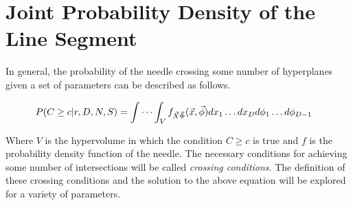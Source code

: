 \documentclass{article}
\begin{document}
\section{Joint Probability Density of the Line Segment} \label{s:needle pdf}
In general, the probability of the needle crossing some number of hyperplanes given
a set of parameters can be described as follows.

\begin{align} 
	P(C\ge c|r, D, N, S)&=\idotsint_V f_{\vec{X}\vec\Phi}(\vec{x}, \vec{\phi})dx_1 \hdots dx_D d\phi_1 \hdots d\phi_{D-1} \label{eq:raw integral}
\end{align}

Where $V$ is the hypervolume in which the condition $C\ge c$ is true and $f$ is the probability
density function of the needle. The necessary conditions for achieving some number of intersections
will be called \emph{crossing conditions}. The definition of these crossing conditions and the solution to the above equation will be
explored for a variety of parameters.
\end{document}

